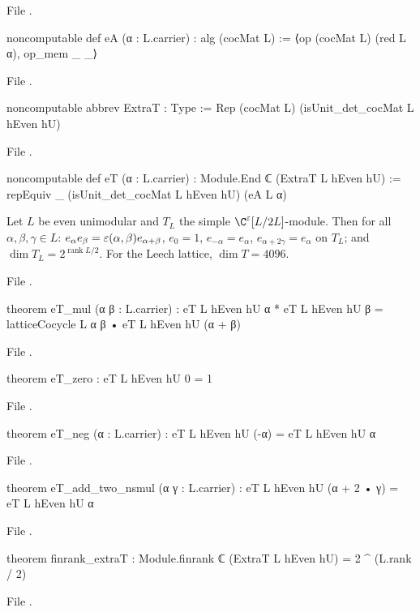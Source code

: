 \noindent File .
\begin{leancode}
noncomputable def eA (α : L.carrier) : alg (cocMat L) := ⟨op (cocMat L) (red L α), op_mem _ _⟩
\end{leancode}
\noindent File .
\begin{leancode}
noncomputable abbrev ExtraT : Type := Rep (cocMat L) (isUnit_det_cocMat L hEven hU)
\end{leancode}
\noindent File .
\begin{leancode}
noncomputable def eT (α : L.carrier) : Module.End ℂ (ExtraT L hEven hU) :=
  repEquiv _ (isUnit_det_cocMat L hEven hU) (eA L α)
\end{leancode}
\begin{theorem}\label{ch06:thm:eT}
Let $L$ be even unimodular and $T_L$ the simple $\C^\chsixeps[L/2L]$-module.  Then for all
$\alpha,\beta,\gamma\in L$:
$e_\alpha e_\beta=\varepsilon(\alpha,\beta)e_{\alpha+\beta}$, $e_0=1$, $e_{-\alpha}=e_\alpha$,
$e_{\alpha+2\gamma}=e_\alpha$ on $T_L$; and $\dim T_L=2^{\operatorname{rank}L/2}$.  For the Leech
lattice, $\dim T=4096$.
\end{theorem}
\noindent File .
\begin{leancode}
theorem eT_mul (α β : L.carrier) :
    eT L hEven hU α * eT L hEven hU β = latticeCocycle L α β • eT L hEven hU (α + β)
\end{leancode}
\noindent File .
\begin{leancode}
theorem eT_zero : eT L hEven hU 0 = 1
\end{leancode}
\noindent File .
\begin{leancode}
theorem eT_neg (α : L.carrier) : eT L hEven hU (-α) = eT L hEven hU α
\end{leancode}
\noindent File .
\begin{leancode}
theorem eT_add_two_nsmul (α γ : L.carrier) : eT L hEven hU (α + 2 • γ) = eT L hEven hU α
\end{leancode}
\noindent File .
\begin{leancode}
theorem finrank_extraT : Module.finrank ℂ (ExtraT L hEven hU) = 2 ^ (L.rank / 2)
\end{leancode}
\noindent File .
